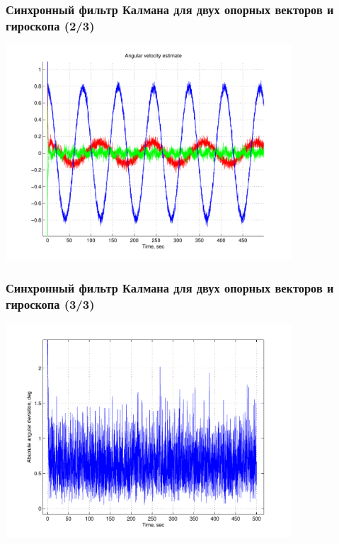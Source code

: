 \documentclass[utf8]{beamer}
\begin{document}
\begin{frame}
\frametitle{Синхронный фильтр Калмана для двух опорных векторов и гироскопа (2/3)}
\begin{center}
    \includegraphics[width=0.8\textwidth]{pic/gyro_sync_omega.pdf}
\end{center}
\end{frame}
\begin{frame}
\frametitle{Синхронный фильтр Калмана для двух опорных векторов и гироскопа (3/3)}
\begin{center}
    \includegraphics[width=0.8\textwidth]{pic/gyro_sync_dphi.pdf}
\end{center}
\end{frame}
\end{document}

